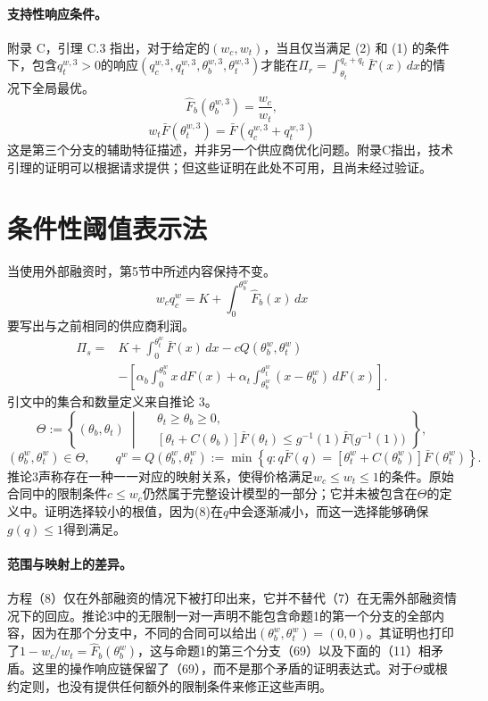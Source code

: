 \documentclass{article}
\begin{document}
\paragraph{支持性响应条件。}
附录 C，引理 C.3 指出，对于给定的$(w_c,w_t)$，当且仅当满足 (2) 和 (1) 的条件下，包含$q_t^{w,3}>0$的响应$(q_c^{w,3},q_t^{w,3},\theta_b^{w,3},\theta_t^{w,3})$才能在$\Pi_r=\int_{\theta_t}^{q_c+q_t}\bar F(x)\,dx$的情况下全局最优。
\begin{equation}
\hat F_b(\theta_b^{w,3})=\frac{w_c}{w_t},\tag{69}
\end{equation}
\begin{equation}
w_t\bar F(\theta_t^{w,3})=\bar F(q_c^{w,3}+q_t^{w,3})\tag{70}
\end{equation}
这是第三个分支的辅助特征描述，并非另一个供应商优化问题。附录C指出，技术引理的证明可以根据请求提供；但这些证明在此处不可用，且尚未经过验证。

\section*{条件性阈值表示法}
当使用外部融资时，第5节中所述内容保持不变。
\[
w_cq_c^w=K+\int_0^{\theta_b^w}\hat F_b(x)\,dx
\]
要写出与之前相同的供应商利润。
\begin{equation}
\begin{aligned}
\Pi_s={}&K+\int_0^{\theta_t^w}\bar F(x)\,dx-cQ(\theta_b^w,\theta_t^w)\\
&-\left[\alpha_b\int_0^{\theta_b^w}x\,dF(x)
+\alpha_t\int_{\theta_b^w}^{\theta_t^w}(x-\theta_b^w)\,dF(x)\right].
\end{aligned}\tag{8}
\end{equation}
引文中的集合和数量定义来自推论 3。
\[
\Theta:=\left\{(\theta_b,\theta_t)\;\middle|\;
\begin{aligned}
&\theta_t\geq\theta_b\geq0,\\
&[\theta_t+C(\theta_b)]\bar F(\theta_t)
 \leq g^{-1}(1)\bar F\bigl(g^{-1}(1)\bigr)
\end{aligned}\right\},
\]
\[
(\theta_b^w,\theta_t^w)\in\Theta,
\qquad
q^w=Q(\theta_b^w,\theta_t^w)
:=\min\left\{q:q\bar F(q)
 =[\theta_t^w+C(\theta_b^w)]\bar F(\theta_t^w)\right\}.
\]
推论3声称存在一种一一对应的映射关系，使得价格满足$w_c\leq w_t\leq1$的条件。原始合同中的限制条件$c\leq w_c$仍然属于完整设计模型的一部分；它并未被包含在$\Theta$的定义中。证明选择较小的根值，因为(8)在$q$中会逐渐减小，而这一选择能够确保$g(q)\leq1$得到满足。

\paragraph{范围与映射上的差异。}
方程（8）仅在外部融资的情况下被打印出来，它并不替代（7）在无需外部融资情况下的回应。推论3中的无限制一对一声明不能包含命题1的第一个分支的全部内容，因为在那个分支中，不同的合同可以给出$(\theta_b^w,\theta_t^w)=(0,0)$。其证明也打印了$1-w_c/w_t=\hat F_b(\theta_b^w)$，这与命题1的第三个分支（69）以及下面的（11）相矛盾。这里的操作响应链保留了（69），而不是那个矛盾的证明表达式。对于$\Theta$或根约定则，也没有提供任何额外的限制条件来修正这些声明。
\end{document}

